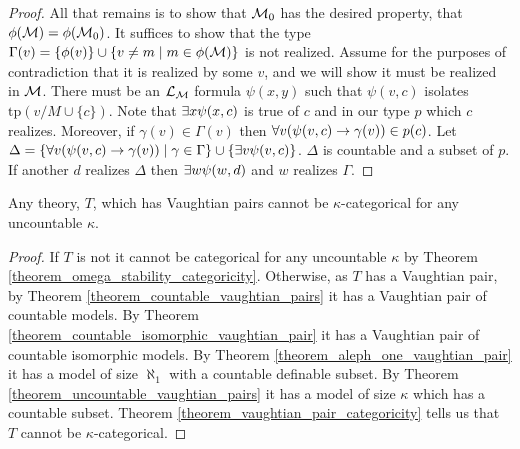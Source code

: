 \begin{proof}
All that remains is to show that \(\mathcal{M}_0\) has the desired property, that \(\phi(\mathcal{M}) = \phi(\mathcal{M}_0)\).   
It suffices to show that the type \(\Gamma(v) = \{\phi(v)\} \cup \{v \neq m \mid m \in \phi(\mathcal{M})\}\) is not realized. 
Assume for the purposes of contradiction that it is realized by some \(v\), and we will show it must be realized in \(\mathcal{M}\). 
There must be an \(\mathcal{L}_{\mathcal{M}}\) formula \(\psi(x, y)\) such that \(\psi(v, c)\) isolates \(\text{tp}(v/M \cup \{c\})\).%
Note that \(\exists x \psi(x, c)\) is true of \(c\) and in our type \(p\) which \(c\) realizes. 
Moreover, if \(\gamma(v) \in \Gamma(v)\) then \(\forall v (\psi(v, c) \to \gamma(v)) \in p(c)\). 
Let \(\Delta = \{\forall v (\psi(v, c) \to \gamma(v)) \mid \gamma \in \Gamma\} \cup \{\exists v \psi(v, c)\}\).
\(\Delta\) is countable and a subset of \(p\). 
If another \(d\) realizes \(\Delta\) then \(\exists w \psi(w, d)\) and \(w\) realizes \(\Gamma\). %


\end{proof}

\begin{theorem}\label{theorem_vaughtian_pairs_categoricity}
Any theory, \(T\), which has Vaughtian pairs cannot be \(\kappa\)-categorical for any uncountable \(\kappa\).
\end{theorem}

\begin{proof}
If \(T\) is not \omst it cannot be categorical for any uncountable \(\kappa\) by Theorem \ref{theorem_omega_stability_categoricity}.
Otherwise, as \(T\) has a Vaughtian pair, by Theorem \ref{theorem_countable_vaughtian_pairs} it has a Vaughtian pair of countable models. 
By Theorem \ref{theorem_countable_isomorphic_vaughtian_pair} it has a Vaughtian pair of countable isomorphic models.
By Theorem \ref{theorem_aleph_one_vaughtian_pair} it has a model of size \(\aleph_1\) with a countable definable subset. 
By Theorem \ref{theorem_uncountable_vaughtian_pairs} it has a model of size \(\kappa\) which has a countable subset.  
Theorem \ref{theorem_vaughtian_pair_categoricity} tells us that \(T\) cannot be \(\kappa\)-categorical. 
\end{proof}
